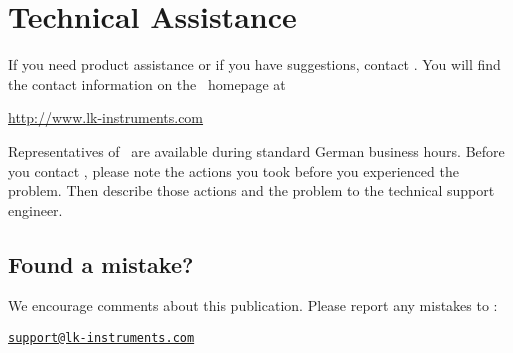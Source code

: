
\section{Technical Assistance}
If you need product assistance or if you have suggestions, contact \docAuthor.
You will find the contact information on the \docAuthor~homepage at
\begin{center}
  \url{http://www.lk-instruments.com}
\end{center}
Representatives of \docAuthor~are available during standard German business hours.
Before you contact \docAuthor, please note the actions you took before you experienced
the problem. Then describe those actions and the problem to the technical support
engineer.

\subsection{Found a mistake?}
We encourage comments about this publication. Please report any mistakes
to \docAuthor:
\begin{center}
  \href{mailto:support@lk-instruments.com}{\nolinkurl{support@lk-instruments.com}}
\end{center}






\newpage